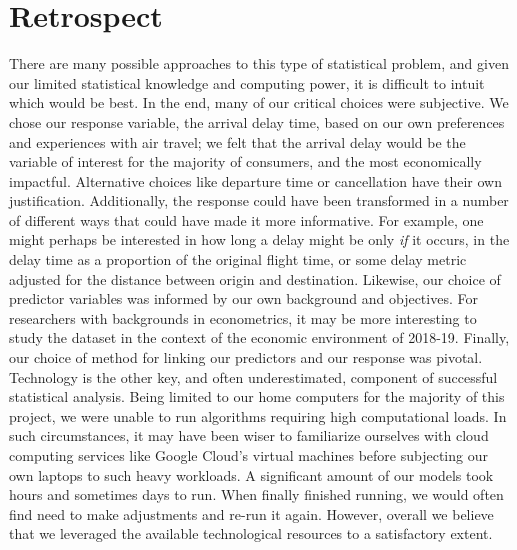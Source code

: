 \documentclass[12pt, a4paper, openany]{book}
\newcommand\tab[1][1cm]{\hspace*{#1}}
\begin{document}
	\section{Retrospect}
	\tab There are many possible approaches to this type of statistical problem, and given our limited statistical knowledge and computing power, it is difficult to intuit which would be best. In the end, many of our critical choices were subjective. We chose our response variable, the arrival delay time, based on our own preferences and experiences with air travel; we felt that the arrival delay would be the variable of interest for the majority of consumers, and the most economically impactful. Alternative choices like departure time or cancellation have their own justification. Additionally, the response could have been transformed in a number of different ways that could have made it more informative. For example, one might perhaps be interested in how long a delay might be only \textit{if} it occurs, in the delay time as a proportion of the original flight time, or some delay metric adjusted for the distance between origin and destination. Likewise, our choice of predictor variables was informed by our own background and objectives. For researchers with backgrounds in econometrics, it may be more interesting to study the dataset in the context of the economic environment of 2018-19. Finally, our choice of method for linking our predictors and our response was pivotal. \\
	\tab  Technology is the other key, and often underestimated, component of successful statistical analysis. Being limited to our home computers for the majority of this project, we were unable to run algorithms requiring high computational loads. In such circumstances, it may have been wiser to familiarize ourselves with cloud computing services like Google Cloud's virtual machines before subjecting our own laptops to such heavy workloads. A significant amount of our models took hours and sometimes days to run. When finally finished running, we would often find need to make adjustments and re-run it again. However, overall we believe that we leveraged the available technological resources to a satisfactory extent. 
\end{document}
